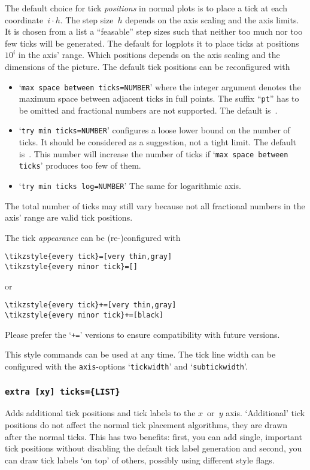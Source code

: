 \noindent
The default choice for tick \emph{positions} in normal plots is to place a tick at each coordinate~$i\cdot h$. The step size~$h$ depends on the axis scaling and the axis limits. It is chosen from a list a ``feasable'' step sizes such that neither too much nor too few ticks will be generated. The default for logplots it to place ticks at positions $10^i$ in the axis' range. Which positions depends on the axis scaling and the dimensions of the picture. The default tick positions can be reconfigured with
\begin{itemize}
	\item `\lstinline!max space between ticks=NUMBER!' where the integer argument denotes the maximum space between adjacent ticks in full points. The suffix ``\texttt{pt}'' has to be omitted and fractional numbers are not supported. The default is~\axisdefaulttickwidth.
	\item `\lstinline!try min ticks=NUMBER!' configures a loose lower bound on the number of ticks. It should be considered as a suggestion, not a tight limit. The default is~\axisdefaulttryminticks. This number will increase the number of ticks if `\texttt{max space between ticks}' produces too few of them.
	\item `\lstinline!try min ticks log=NUMBER!' The same for logarithmic axis.
\end{itemize}
The total number of ticks may still vary because not all fractional numbers in the axis' range are valid tick positions.


\noindent
The tick \emph{appearance} can be (re-)configured with
\begin{lstlisting}
\tikzstyle{every tick}=[very thin,gray]
\tikzstyle{every minor tick}=[]
\end{lstlisting}
or
\begin{lstlisting}
\tikzstyle{every tick}+=[very thin,gray]
\tikzstyle{every minor tick}+=[black]
\end{lstlisting}
Please prefer the `\texttt{+=}' versions to ensure compatibility with future versions.

This style commands can be used at any time. The tick line width can be configured with the \lstinline!axis!-options `\texttt{tickwidth}' and `\texttt{subtickwidth}'.

\subsubsection{\texttt{extra [xy] ticks=\{LIST\}}}
Adds additional tick positions and tick labels to the $x$~or~$y$ axis. `Additional' tick positions do not affect the normal tick placement algorithms, they are drawn after the normal ticks. This has two benefits: first, you can add single, important tick positions without disabling the default tick label generation and second, you can draw tick labels `on top' of others, possibly using different style flags.

